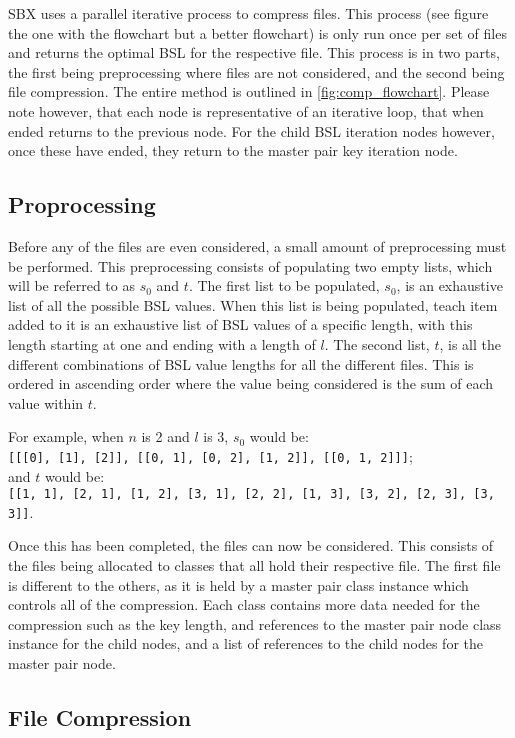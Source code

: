 \documentclass{hehe}
\begin{document}
SBX uses a parallel iterative process to compress files. This process (see figure the one with the flowchart but a better flowchart) is only run once per set of files and returns the optimal BSL for the respective file. This process is in two parts, the first being preprocessing where files are not considered, and the second being file compression. The entire method is outlined in \cref{fig:comp_flowchart}. Please note however, that each node is representative of an iterative loop, that when ended returns to the previous node. For the child BSL iteration nodes however, once these have ended, they return to the master pair key iteration node.

\subsection{Proprocessing}

Before any of the files are even considered, a small amount of preprocessing must be performed. This preprocessing consists of populating two empty lists, which will be referred to as $s_0$ and $t$. The first list to be populated, $s_0$, is an exhaustive list of all the possible BSL values. When this list is being populated, teach item added to it is an exhaustive list of BSL values of a specific length, with this length starting at one and ending with a length of $l$. The second list, $t$, is all the different combinations of BSL value lengths for all the different files. This is ordered in ascending order where the value being considered is the sum of each value within $t$.

For example, when $n$ is 2 and $l$ is 3, $s_0$ would be:\\\texttt{[[[0], [1], [2]], [[0, 1], [0, 2], [1, 2]], [[0, 1, 2]]]};\\and $t$ would be:\\\texttt{[[1, 1], [2, 1], [1, 2], [3, 1], [2, 2], [1, 3], [3, 2], [2, 3], [3, 3]]}.

Once this has been completed, the files can now be considered. This consists of the files being allocated to classes that all hold their respective file. The first file is different to the others, as it is held by a master pair class instance which controls all of the compression. Each class contains more data needed for the compression such as the key length, and references to the master pair node class instance for the child nodes, and a list of references to the child nodes for the master pair node.

\subsection{File Compression}
\end{document}
